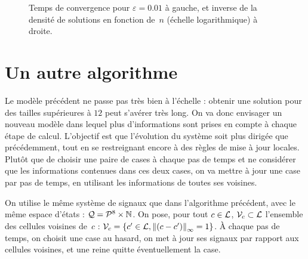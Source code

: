 \begin{figure}[htb]
  \quad
  \caption{Temps de convergence pour $\varepsilon=0.01$ à gauche, et inverse de
    la densité de solutions en fonction de~$n$ (échelle logarithmique) à droite.}
  \label{fig:densite}
\end{figure} 


\section{Un autre algorithme}

Le modèle précédent ne passe pas très bien à l'échelle : obtenir une solution pour des tailles supérieures à $12$ peut s'avérer très long. On va donc envisager un nouveau modèle dans lequel plus d'informations sont prises en compte à chaque étape de calcul. L'objectif est que l'évolution du système soit plus dirigée que précédemment, tout en se restreignant encore à des règles de mise à jour locales. Plutôt que de choisir une paire de cases à chaque pas de temps et ne considérer que les informations contenues dans ces deux cases, on va mettre à jour une case par pas de temps, en utilisant les informations de toutes ses voisines. 

On utilise le même système de signaux que dans l'algorithme précédent, avec le même espace d'états : $\mathcal{Q} = {\mathcal{P}^8}\times\mathbb{N}$. On pose, pour tout $c\in\mathcal{L}$, $\mathcal V_c\subset\mathcal{L}$ l'ensemble des cellules voisines de~$c$ : $\mathcal V_c = \{c' \in \mathcal{L}, \left\lVert(c-c')\right\rVert_\infty = 1\}$.
À chaque pas de temps, on choisit une case au hasard, on met à jour ses signaux par rapport aux cellules voisines, et une reine quitte éventuellement la case. 

